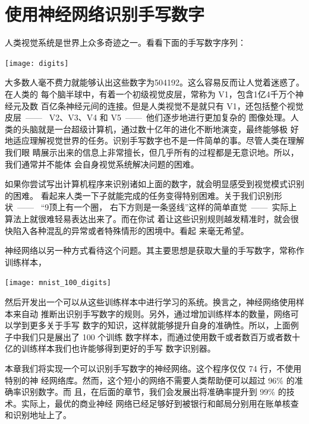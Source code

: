 
\chapter{使用神经网络识别手写数字}
\label{ch:UsingNeuralNetsToRecognizeHandwrittenDigits}

人类视觉系统是世界上众多奇迹之一。看看下面的手写数字序列：
\begin{center}
  \texttt{[image: digits]}\label{fig:digits}
\end{center}

大多数人毫不费力就能够认出这些数字为504192。这么容易反而让人觉着迷惑了。在人类的
每个脑半球中，有着一个初级视觉皮层，常称为 {\serif V1}，包含1亿4千万个神经元及数
百亿条神经元间的连接。但是人类视觉不是就只有 {\serif V1}，还包括整个视觉皮层~——~
{\serif V2}、{\serif V3}、{\serif V4} 和 {\serif V5}~——~他们逐步地进行更加复杂的
图像处理。人类的头脑就是一台超级计算机，通过数十亿年的进化不断地演变，最终能够极
好地适应理解视觉世界的任务。识别手写数字也不是一件简单的事。尽管人类在理解我们眼
睛展示出来的信息上非常擅长，但几乎所有的过程都是无意识地。所以，我们通常并不能体
会自身视觉系统解决问题的困难。

如果你尝试写出计算机程序来识别诸如上面的数字，就会明显感受到视觉模式识别的困难。
看起来人类一下子就能完成的任务变得特别困难。关于我们识别形状~——~ “9顶上有一个圈，
右下方则是一条竖线”这样的简单直觉~——~实际上算法上就很难轻易表达出来了。而在你试
着让这些识别规则越发精准时，就会很快陷入各种混乱的异常或者特殊情形的困境中。看起
来毫无希望。

神经网络以另一种方式看待这个问题。其主要思想是获取大量的手写数字，常称作训练样本，
\begin{center}
  \texttt{[image: mnist\_100\_digits]}
\end{center}

然后开发出一个可以从这些训练样本中进行学习的系统。换言之，神经网络使用样本来自动
推断出识别手写数字的规则。另外，通过增加训练样本的数量，网络可以学到更多关于手写
数字的知识，这样就能够提升自身的准确性。所以，上面例子中我们只是展出了 100 个训练
数字样本，而通过使用数千或者数百万或者数十亿的训练样本我们也许能够得到更好的手写
数字识别器。

本章我们将实现一个可以识别手写数字的神经网络。这个程序仅仅 74 行，不使用特别的神
经网络库。然而，这个短小的网络不需要人类帮助便可以超过 96\% 的准确率识别数字。而
且，在后面的章节，我们会发展出将准确率提升到 99\% 的技术。实际上，最优的商业神经
网络已经足够好到被银行和邮局分别用在账单核查和识别地址上了。

